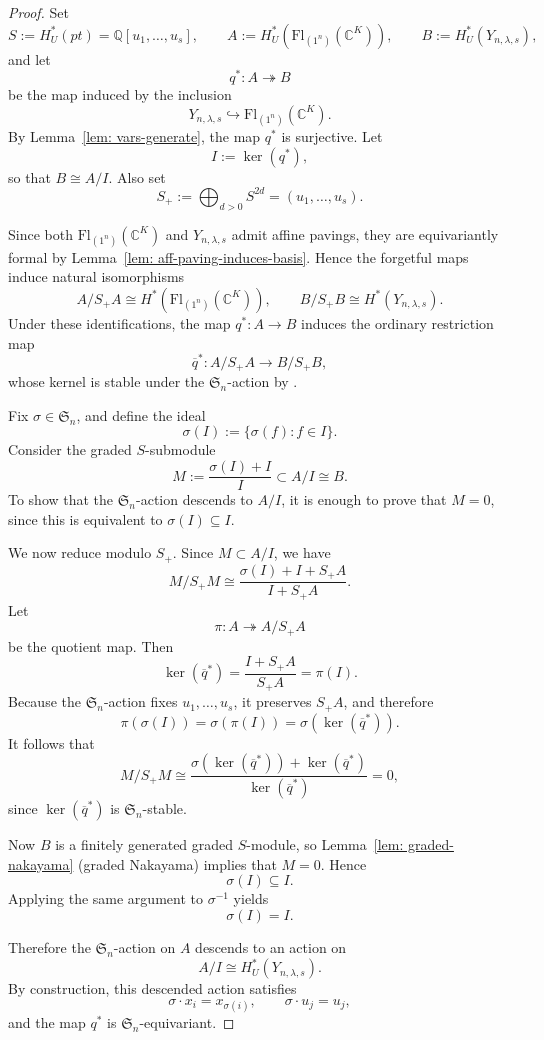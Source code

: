 \documentclass[11pt]{amsart}
\numberwithin{equation}{section}
\theoremstyle{definition}
\newcommand{\symm}{{\mathfrak{S}}}
\newcommand{\CC}{{\mathbb{C}}}
\newcommand{\QQ}{{\mathbb{Q}}}
\newcommand{\Fl}{\text{Fl}}
\begin{document}
\begin{proof}
Set
\[
S := H_U^*(pt)=\QQ[u_1,\dots,u_s],
\qquad
A := H_U^*(\Fl_{(1^n)}(\CC^K)),
\qquad
B := H_U^*(Y_{n,\lambda,s}),
\]
and let
\[
q^*:A \twoheadrightarrow B
\]
be the map induced by the inclusion
\[
Y_{n,\lambda,s}\hookrightarrow \Fl_{(1^n)}(\CC^K).
\]
By Lemma~\ref{lem: vars-generate}, the map \(q^*\) is surjective. Let
\[
I:=\ker(q^*),
\]
so that \(B\cong A/I\). Also set
\[
S_+ := \bigoplus_{d>0} S^{2d} = (u_1,\dots,u_s).
\]

Since both \(\Fl_{(1^n)}(\CC^K)\) and \(Y_{n,\lambda,s}\) admit affine pavings,
they are equivariantly formal by Lemma~\ref{lem: aff-paving-induces-basis}.
Hence the forgetful maps induce natural isomorphisms
\[
A/S_+A \cong H^*(\Fl_{(1^n)}(\CC^K)),
\qquad
B/S_+B \cong H^*(Y_{n,\lambda,s}).
\]
Under these identifications, the map \(q^*:A\to B\) induces the ordinary
restriction map
\[
\overline q^*: A/S_+A \longrightarrow B/S_+B,
\]
whose kernel is stable under the \(\symm_n\)-action by
\cite[Section~5]{GLW}.

Fix \(\sigma\in\symm_n\), and define the ideal
\[
\sigma(I):=\{\sigma(f):f\in I\}.
\]
Consider the graded \(S\)-submodule
\[
M:=\frac{\sigma(I)+I}{I}\subset A/I\cong B.
\]
To show that the \(\symm_n\)-action descends to \(A/I\), it is enough to prove
that \(M=0\), since this is equivalent to \(\sigma(I)\subseteq I\).

We now reduce modulo \(S_+\). Since \(M\subset A/I\), we have
\[
M/S_+M
\cong
\frac{\sigma(I)+I+S_+A}{I+S_+A}.
\]
Let
\[
\pi:A\twoheadrightarrow A/S_+A
\]
be the quotient map. Then
\[
\ker(\overline q^*) = \frac{I+S_+A}{S_+A} = \pi(I).
\]
Because the \(\symm_n\)-action fixes \(u_1,\dots,u_s\), it preserves \(S_+A\),
and therefore
\[
\pi(\sigma(I))=\sigma(\pi(I))=\sigma(\ker(\overline q^*)).
\]
It follows that
\[
M/S_+M
\cong
\frac{\sigma(\ker(\overline q^*))+\ker(\overline q^*)}
     {\ker(\overline q^*)}
=0,
\]
since \(\ker(\overline q^*)\) is \(\symm_n\)-stable.

Now \(B\) is a finitely generated graded \(S\)-module, so
Lemma~\ref{lem: graded-nakayama} (graded Nakayama) implies that \(M=0\). Hence
\[
\sigma(I)\subseteq I.
\]
Applying the same argument to \(\sigma^{-1}\) yields
\[
\sigma(I)=I.
\]

Therefore the \(\symm_n\)-action on \(A\) descends to an action on
\[
A/I \cong H_U^*(Y_{n,\lambda,s}).
\]
By construction, this descended action satisfies
\[
\sigma\cdot x_i=x_{\sigma(i)},
\qquad
\sigma\cdot u_j=u_j,
\]
and the map \(q^*\) is \(\symm_n\)-equivariant.
\end{proof}
\end{document}
